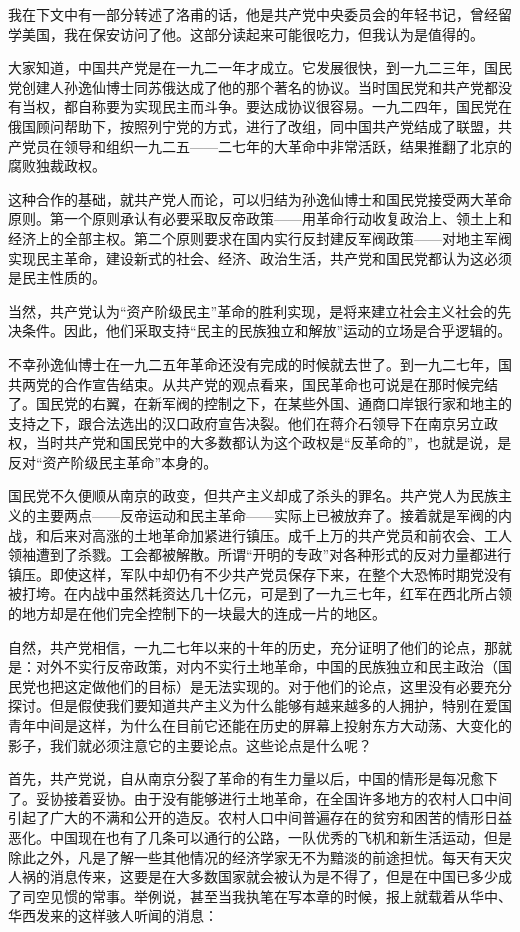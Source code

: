 \documentclass[10pt]{book}
\begin{document}
我在下文中有一部分转述了洛甫的话，他是共产党中央委员会的年轻书记，曾经留学美国，我在保安访问了他。这部分读起来可能很吃力，但我认为是值得的。

大家知道，中国共产党是在一九二一年才成立。它发展很快，到一九二三年，国民党创建人孙逸仙博士同苏俄达成了他的那个著名的协议。当时国民党和共产党都没有当权，都自称要为实现民主而斗争。要达成协议很容易。一九二四年，国民党在俄国顾问帮助下，按照列宁党的方式，进行了改组，同中国共产党结成了联盟，共产党员在领导和组织一九二五——二七年的大革命中非常活跃，结果推翻了北京的腐败独裁政权。

这种合作的基础，就共产党人而论，可以归结为孙逸仙博士和国民党接受两大革命原则。第一个原则承认有必要采取反帝政策——用革命行动收复政治上、领土上和经济上的全部主权。第二个原则要求在国内实行反封建反军阀政策——对地主军阀实现民主革命，建设新式的社会、经济、政治生活，共产党和国民党都认为这必须是民主性质的。

当然，共产党认为“资产阶级民主”革命的胜利实现，是将来建立社会主义社会的先决条件。因此，他们采取支持“民主的民族独立和解放”运动的立场是合乎逻辑的。

不幸孙逸仙博士在一九二五年革命还没有完成的时候就去世了。到一九二七年，国共两党的合作宣告结束。从共产党的观点看来，国民革命也可说是在那时候完结了。国民党的右翼，在新军阀的控制之下，在某些外国、通商口岸银行家和地主的支持之下，跟合法选出的汉口政府宣告决裂。他们在蒋介石领导下在南京另立政权，当时共产党和国民党中的大多数都认为这个政权是“反革命的”，也就是说，是反对“资产阶级民主革命”本身的。

国民党不久便顺从南京的政变，但共产主义却成了杀头的罪名。共产党人为民族主义的主要两点——反帝运动和民主革命——实际上已被放弃了。接着就是军阀的内战，和后来对高涨的土地革命加紧进行镇压。成千上万的共产党员和前农会、工人领袖遭到了杀戮。工会都被解散。所谓“开明的专政”对各种形式的反对力量都进行镇压。即使这样，军队中却仍有不少共产党员保存下来，在整个大恐怖时期党没有被打垮。在内战中虽然耗资达几十亿元，可是到了一九三七年，红军在西北所占领的地方却是在他们完全控制下的一块最大的连成一片的地区。

自然，共产党相信，一九二七年以来的十年的历史，充分证明了他们的论点，那就是：对外不实行反帝政策，对内不实行土地革命，中国的民族独立和民主政治（国民党也把这定做他们的目标）是无法实现的。对于他们的论点，这里没有必要充分探讨。但是假使我们要知道共产主义为什么能够有越来越多的人拥护，特别在爱国青年中间是这样，为什么在目前它还能在历史的屏幕上投射东方大动荡、大变化的影子，我们就必须注意它的主要论点。这些论点是什么呢？

首先，共产党说，自从南京分裂了革命的有生力量以后，中国的情形是每况愈下了。妥协接着妥协。由于没有能够进行土地革命，在全国许多地方的农村人口中间引起了广大的不满和公开的造反。农村人口中间普遍存在的贫穷和困苦的情形日益恶化。中国现在也有了几条可以通行的公路，一队优秀的飞机和新生活运动，但是除此之外，凡是了解一些其他情况的经济学家无不为黯淡的前途担忧。每天有天灾人祸的消息传来，这要是在大多数国家就会被认为是不得了，但是在中国已多少成了司空见惯的常事。举例说，甚至当我执笔在写本章的时候，报上就载着从华中、华西发来的这样骇人听闻的消息：
\end{document}
